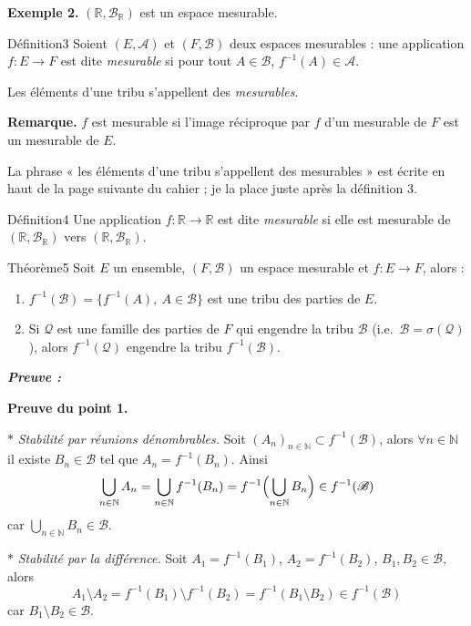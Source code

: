 \documentclass[11pt,a4paper]{article}
\newcommand{\R}{\mathbb{R}}
\newcommand{\N}{\mathbb{N}}
\newcommand{\A}{\mathscr{A}}
\newcommand{\B}{\mathscr{B}}
\newcommand{\Qq}{\mathscr{Q}}
\newenvironment{preuve}{\par\textit{\textbf{Preuve :}}\par\nopagebreak[4]}{\par}
\begin{document}
\textbf{\color{bleu}Exemple 2.} $(\R,\B_{\R})$ est un espace mesurable.

\begin{enonce}{Définition}{3}
Soient $(E,\A)$ et $(F,\B)$ deux espaces mesurables : une application $f:E\to F$ est dite \emph{mesurable}
si pour tout $A\in\B$, $f^{-1}(A)\in\A$.
\end{enonce}

Les éléments d'une tribu s'appellent des \emph{mesurables}.

\textbf{\color{bleu}Remarque.}
$f$ est mesurable si l'image réciproque par $f$ d'un mesurable de $F$ est un mesurable de $E$.

\begin{note}
La phrase « les éléments d'une tribu s'appellent des mesurables » est écrite en haut de la page suivante
du cahier ; je la place juste après la définition 3.
\end{note}

\begin{enonce}{Définition}{4}
Une application $f:\R\to\R$ est dite \emph{mesurable} si elle est mesurable de $(\R,\B_{\R})$ vers $(\R,\B_{\R})$.
\end{enonce}

\begin{enonce}{Théorème}{5}
Soit $E$ un ensemble, $(F,\B)$ un espace mesurable et $f:E\to F$, alors :
\begin{enumerate}[label=\textbf{\arabic*-},leftmargin=1.2cm]
  \item $f^{-1}(\B)=\bigl\{f^{-1}(A),\ A\in\B\bigr\}$ est une tribu des parties de $E$.
  \item Si $\Qq$ est une famille des parties de $F$ qui engendre la tribu $\B$ (i.e.\ $\B=\sigma(\Qq)$),
        alors $f^{-1}(\Qq)$ engendre la tribu $f^{-1}(\B)$.
\end{enumerate}
\end{enonce}

\begin{preuve}\end{preuve}
\textbf{Preuve du point 1.}

$\ast$ \emph{Stabilité par réunions dénombrables.} Soit $(A_n)_{n\in\N}\subset f^{-1}(\B)$, alors $\forall n\in\N$
il existe $B_n\in\B$ tel que $A_n=f^{-1}(B_n)$. Ainsi
\[
  \bigcup_{n\in\N}A_n=\bigcup_{n\in\N}f^{-1}(B_n)=f^{-1}\Bigl(\bigcup_{n\in\N}B_n\Bigr)\in f^{-1}(\B)
\]
car $\bigcup_{n\in\N}B_n\in\B$.

$\ast$ \emph{Stabilité par la différence.} Soit $A_1=f^{-1}(B_1)$, $A_2=f^{-1}(B_2)$, $B_1,B_2\in\B$, alors
\[
  A_1\setminus A_2=f^{-1}(B_1)\setminus f^{-1}(B_2)=f^{-1}(B_1\setminus B_2)\in f^{-1}(\B)
\]
car $B_1\setminus B_2\in\B$.
\end{document}
